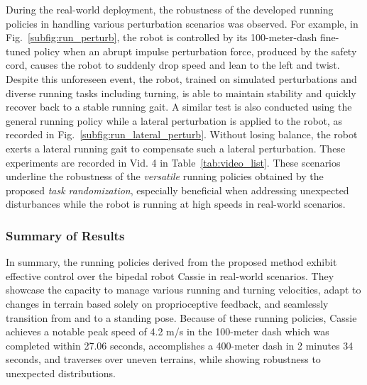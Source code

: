 During the real-world deployment, the robustness of the developed running policies in handling various perturbation scenarios was observed. 
For example, in Fig.~\ref{subfig:run_perturb}, the robot is controlled by its 100-meter-dash fine-tuned policy when an abrupt impulse perturbation force, produced by the safety cord, causes the robot to suddenly drop speed and lean to the left and twist. 
Despite this unforeseen event, the robot, trained on simulated perturbations and diverse running tasks including turning, is able to maintain stability and quickly recover back to a stable running gait. 
A similar test is also conducted using the general running policy while a lateral perturbation is applied to the robot, as recorded in Fig.~\ref{subfig:run_lateral_perturb}. 
Without losing balance, the robot exerts a lateral running gait to compensate such a lateral perturbation.  
These experiments are recorded in Vid. 4 in Table~\ref{tab:video_list}.
These scenarios underline the robustness of the \emph{versatile} running policies obtained by the proposed \emph{task randomization}, especially beneficial when addressing unexpected disturbances while the robot is running at high speeds in real-world scenarios.








\subsubsection{Summary of Results}
In summary, the running policies derived from the proposed method exhibit effective control over the bipedal robot Cassie in real-world scenarios. They showcase the capacity to manage various running and turning velocities, adapt to changes in terrain based solely on proprioceptive feedback, and seamlessly transition from and to a standing pose. Because of these running policies, Cassie achieves a notable peak speed of 4.2 m/s in the 100-meter dash which was completed within 27.06 seconds, accomplishes a 400-meter dash in 2 minutes 34 seconds, and traverses over uneven terrains, while showing robustness to unexpected distributions. 





